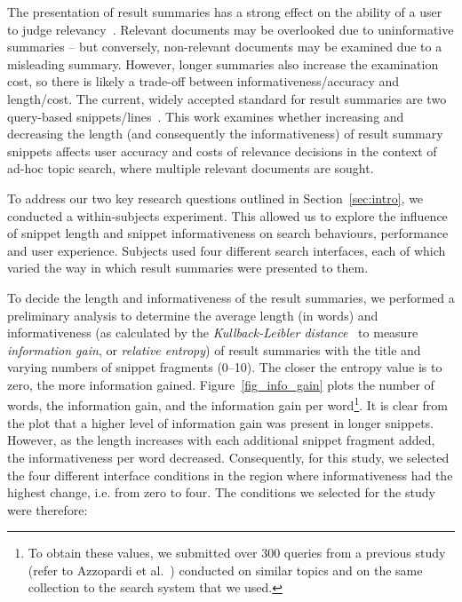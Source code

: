 The presentation of result summaries has a strong effect on the ability of a user to judge relevancy~\cite{he2012bridging}. Relevant documents may be overlooked due to uninformative summaries -- but conversely, non-relevant documents may be examined due to a misleading summary. However, longer summaries also increase the examination cost, so there is likely a trade-off between informativeness/accuracy and length/cost. The current, widely accepted standard for result summaries are two query-based snippets/lines~\cite{hearst2009_search}. This work examines whether increasing and decreasing the length (and consequently the informativeness) of result summary snippets affects user accuracy and costs of relevance decisions in the context of ad-hoc topic search, where multiple relevant documents are sought.

To address our two key research questions outlined in Section~\ref{sec:intro}, we conducted a within-subjects experiment. This allowed us to explore the influence of snippet length and snippet informativeness on search behaviours, performance and user experience. Subjects used four different search interfaces, each of which varied the way in which result summaries were presented to them.

To decide the length and informativeness of the result summaries, we performed a preliminary analysis to determine the average length (in words) and informativeness (as calculated by the \emph{Kullback-Leibler distance}~\cite{kullback1951information} to measure \emph{information gain}, or \emph{relative entropy}) of result summaries with the title and varying numbers of snippet fragments (0--10). The closer the entropy value is to zero, the more information gained. Figure~\ref{fig_info_gain} plots the number of words, the information gain, and the information gain per word\footnote{To obtain these values, we submitted over 300 queries from a previous study (refer to Azzopardi et al.~\cite{azzopardi2013query_cost}) conducted on similar topics and on the same collection to the search system that we used.}. It is clear from the plot that a higher level of information gain was present in longer snippets. However, as the length increases with each additional snippet fragment added, the informativeness per word decreased. Consequently, for this study, we selected the four different interface conditions in the region where informativeness had the highest change, i.e. from zero to four. The conditions we selected for the study were therefore:

